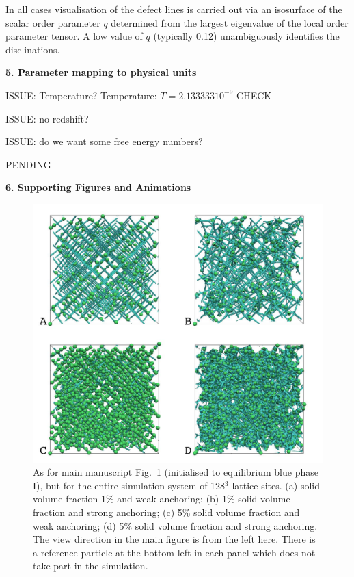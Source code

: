 \documentclass[12pt,twoside]{article}
\begin{document}
In all cases visualisation of the defect lines is carried out via
an isosurface of the scalar order parameter $q$ determined from the
largest eigenvalue of the local order parameter tensor. A low value
of $q$ (typically 0.12) unambiguously identifies the disclinations.

{\bf 5. Parameter mapping to physical units}

ISSUE: Temperature?  Temperature: $T = 2.133333 10^{-9}$ CHECK

ISSUE: no redshift?

ISSUE: do we want some free energy numbers?

PENDING

{\bf 6. Supporting Figures and Animations}

\begin{figure}
\begin{center}
\includegraphics[scale=0.35]{s1.jpg}
\end{center}
\caption{As for main manuscript Fig.~1 (initialised to equilibrium blue
phase I), but for the entire simulation
system of 128$^3$ lattice sites. (a) solid volume fraction 1\% and
weak anchoring; (b) 1\% solid volume fraction and strong anchoring;
(c) 5\% solid volume fraction and weak anchoring; (d) 5\% solid
volume fraction and strong anchoring. The view direction in the
main figure is from the left here. There is a reference
particle at the bottom left in each panel which does not take part
in the simulation.}
\end{figure}
\end{document}
